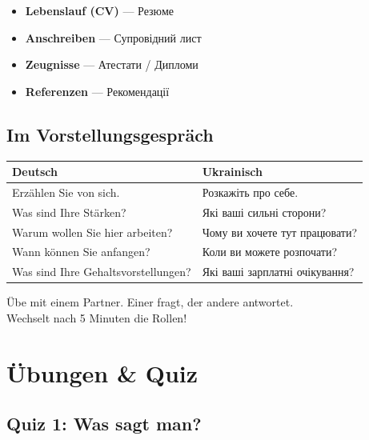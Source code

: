 \documentclass[12pt,twoside,openright]{memoir}
\begin{document}
\begin{lernkasten}
\begin{itemize}[nosep]
  \item \textbf{Lebenslauf (CV)} — Резюме
  \item \textbf{Anschreiben} — Супровідний лист
  \item \textbf{Zeugnisse} — Атестати / Дипломи
  \item \textbf{Referenzen} — Рекомендації
\end{itemize}
\end{lernkasten}

\section{Im Vorstellungsgespräch}

\begin{lernkasten}
\begin{tabular}{p{5cm} p{5cm}}
\toprule
\textbf{Deutsch} & \textbf{Ukrainisch} \\
\midrule
Erzählen Sie von sich. & Розкажіть про себе. \\
Was sind Ihre Stärken? & Які ваші сильні сторони? \\
Warum wollen Sie hier arbeiten? & Чому ви хочете тут працювати? \\
Wann können Sie anfangen? & Коли ви можете розпочати? \\
Was sind Ihre Gehaltsvorstellungen? & Які ваші зарплатні очікування? \\
\bottomrule
\end{tabular}
\end{lernkasten}

\begin{uebungskasten}
Übe mit einem Partner. Einer fragt, der andere antwortet. \\
Wechselt nach 5 Minuten die Rollen!
\end{uebungskasten}

\chapter{Übungen \& Quiz}

\section{Quiz 1: Was sagt man?}
\end{document}
